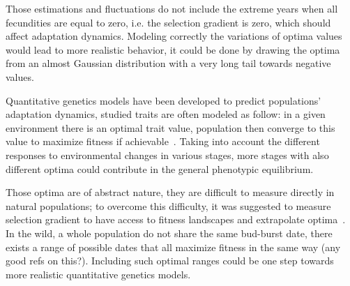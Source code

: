 Those estimations and fluctuations do not include the extreme years when all fecundities are equal to zero, i.e. the selection gradient is zero, which should affect adaptation dynamics. Modeling correctly the variations of optima values would lead to more realistic behavior, it could be done by drawing the optima from an almost Gaussian distribution with a very long tail towards negative values.

Quantitative genetics models have been developed to predict populations' adaptation dynamics, studied traits are often modeled as follow: in a given environment there is an optimal trait value, population then converge to this value to maximize fitness if achievable~\citep{lande_quantitative_1982}. Taking into account the different responses to environmental changes in various stages, more stages with also different optima could contribute in the general phenotypic equilibrium.

Those optima are of abstract nature, they are difficult to measure directly in natural populations; to overcome this difficulty, it was suggested to measure selection gradient to have access to fitness landscapes and extrapolate optima~\citep{lynch_evolution_1993}. In the wild, a whole population do not share the same bud-burst date, there exists a range of possible dates that all maximize fitness in the same way (any good refs on this?). Including such optimal ranges could be one step towards more realistic quantitative genetics models.